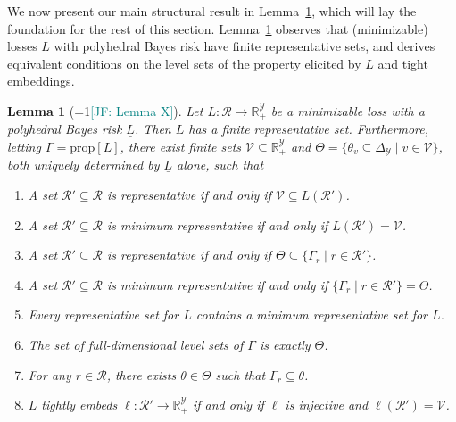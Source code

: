 \documentclass[11pt]{article}
\newcommand{\Comments}{1}
\newcommand{\mynote}[2]{\ifnum\Comments=1\textcolor{#1}{#2}\fi}
\newcommand{\raf}[1]{\mynote{darkgreen}{[RF: #1]}}
\newcommand{\jessie}[1]{\mynote{teal}{[JF: #1]}}
\newcommand{\reals}{\mathbb{R}}
\newcommand{\prop}[1]{\mathrm{prop}[#1]}
\newcommand{\simplex}{\Delta_\Y}
\newcommand{\R}{\mathcal{R}}
\newcommand{\V}{\mathcal{V}}
\newcommand{\Y}{\mathcal{Y}}
\newcommand{\risk}[1]{\underline{#1}}
\newtheorem{lemma}{Lemma}
\begin{document}
We now present our main structural result in Lemma~\ref{lem:X}, which will lay the foundation for the rest of this section.
Lemma~\ref{lem:X} observes that (minimizable) losses $L$ with polyhedral Bayes risk have finite representative sets, and derives equivalent conditions on the level sets of the property elicited by $L$ and tight embeddings.

\begin{lemma}[\jessie{Lemma X}]\label{lem:X}
  Let $L: \R \to \reals^\Y_+$ be a minimizable loss with a polyhedral Bayes risk $\risk L$.
  Then $L$ has a finite representative set.
  Furthermore, letting $\Gamma = \prop{L}$, there exist finite sets
  $\V \subseteq \reals^\Y_+$ and
  $\Theta = \{\theta_v \subseteq \simplex \mid v\in\V\}$,
  both uniquely determined by $\risk{L}$ alone,
  such that
  \begin{enumerate}
  \item A set $\R'\subseteq\R$ is representative if and only if $\V \subseteq L(\R')$.\label{item:X-rep-V}
  \item A set $\R'\subseteq\R$ is minimum representative if and only if $L(\R') = \V$.\label{item:X-min-V}
  \item A set $\R'\subseteq\R$ is representative if and only if $\Theta \subseteq \{\Gamma_r \mid r \in \R'\}$.\label{item:X-rep-Theta}
  \item A set $\R'\subseteq\R$ is minimum representative if and only if $\{\Gamma_r \mid r \in \R'\} = \Theta$.\label{item:X-min-Theta}
  \item Every representative set for $L$ contains a minimum representative set for $L$.\label{item:X-rep-contain-min}
  \item The set of full-dimensional level sets of $\Gamma$ is exactly $\Theta$.\label{item:X-full-dim}
  \item For any $r \in \R$, there exists $\theta \in \Theta$ such that $\Gamma_r \subseteq \theta$.\label{item:X-redundant}
  \item $L$ tightly embeds $\ell:\R'\to\reals^\Y_+$ if and only if $\ell$ is injective and $\ell(\R') = \V$.\label{item:X-tight-embed}
  \end{enumerate}
\end{lemma}
\end{document}
